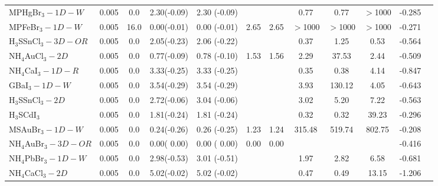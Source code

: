\begin{table*}
\begin{tabular*}{0.98\textwidth}{@{\extracolsep{\fill}}l c c c c c c c c c c c}
     MPHgBr$_3-1D-W$&      0.005&        0.0&       2.30(-0.09)&            2.30  (-0.09)&           &                &            0.77&            0.77&         $>$1000&     -0.285\\
     MPFeBr$_3-1D-W$&      0.005&       16.0&       0.00(-0.01)&            0.00  (-0.01)&       2.65&            2.65&         $>$1000&         $>$1000&         $>$1000&     -0.271\\
H$_3$SSnCl$_3-3D-OR$&      0.005&        0.0&       2.05(-0.23)&            2.06  (-0.22)&           &                &            0.37&            1.25&            0.53&     -0.564\\
   NH$_4$AuCl$_3-2D$&      0.005&        0.0&       0.77(-0.09)&            0.78  (-0.10)&       1.53&            1.56&            2.29&           37.53&            2.44&     -0.509\\
  NH$_4$CaI$_3-1D-R$&      0.005&        0.0&       3.33(-0.25)&            3.33  (-0.25)&           &                &            0.35&            0.38&            4.14&     -0.847\\
       GBaI$_3-1D-W$&      0.005&        0.0&       3.54(-0.29)&            3.54  (-0.29)&           &                &            3.93&          130.12&            4.05&     -0.643\\
   H$_3$SSnCl$_3-2D$&      0.005&        0.0&       2.72(-0.06)&            3.04  (-0.06)&           &                &            3.02&            5.20&            7.22&     -0.563\\
       H$_3$SCdI$_3$&      0.005&        0.0&       1.81(-0.24)&            1.81  (-0.24)&           &                &            0.32&            0.32&           39.23&     -0.296\\
     MSAuBr$_3-1D-W$&      0.005&        0.0&       0.24(-0.26)&            0.26  (-0.25)&       1.23&            1.24&          315.48&          519.74&          802.75&     -0.208\\
NH$_4$AuBr$_3-3D-OR$&      0.005&        0.0&       0.00( 0.00)&            0.00  ( 0.00)&       0.00&            0.00&                &                &                &     -0.416\\
 NH$_4$PbBr$_3-1D-W$&      0.005&        0.0&       2.98(-0.53)&            3.01  (-0.51)&           &                &            1.97&            2.82&            6.58&     -0.681\\
   NH$_4$CaCl$_3-2D$&      0.005&        0.0&       5.02(-0.02)&            5.02  (-0.02)&           &                &            0.47&            0.49&           13.15&     -1.206\\

\end{tabular*}
\end{table*}

